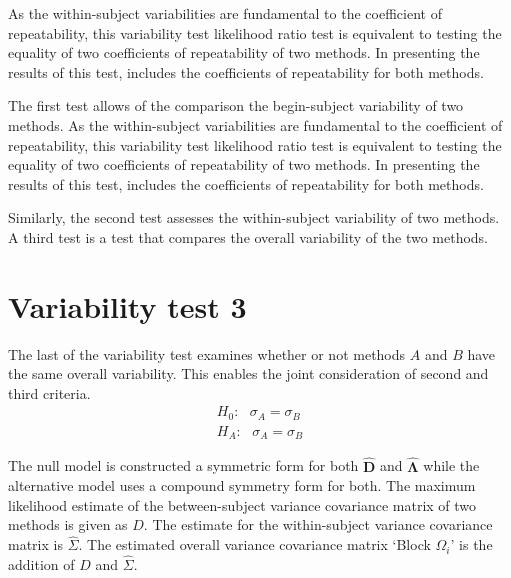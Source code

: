 \documentclass[12pt, a4paper]{report}
\theoremstyle{plain}
\theoremstyle{definition}
\theoremstyle{remark}
\begin{document}
	As the within-subject variabilities are fundamental to the coefficient of repeatability, this variability test likelihood ratio test is equivalent to testing the equality of two coefficients of repeatability of two methods. In presenting the results of this test, \citet{roy} includes the coefficients of repeatability for both methods.
	
	The first test allows of the comparison the begin-subject variability of two methods. As the within-subject variabilities are fundamental to the coefficient of repeatability, this variability test likelihood ratio test is equivalent to testing the equality of two coefficients of repeatability of two methods. In presenting the results of this test, \citet{roy} includes the coefficients of repeatability for both methods.
	
	
	
	Similarly, the second test
	assesses the within-subject variability of two methods. A third test is a test that compares the overall variability of the two methods.
	
	
	
	\newpage
	\section{Variability test 3}
	The last of the variability test examines whether or not methods $A$ and $B$ have the same overall variability. This enables the joint consideration of second and third criteria.
	\begin{eqnarray*}
		H_{0}: \mbox{ }\sigma_{A}  = \sigma_{B} \\
		H_{A}: \mbox{ }\sigma_{A}  = \sigma_{B}
	\end{eqnarray*}
	
	
	The null model is constructed a symmetric form for both $\boldsymbol{\hat{D}}$ and $\boldsymbol{\hat{\Lambda}}$ while the alternative model uses a compound symmetry form for both.
	The maximum likelihood estimate of the between-subject variance
	covariance matrix of two methods is given as $D$. The estimate for
	the within-subject variance covariance matrix is $\hat{\Sigma}$.
	The estimated overall variance covariance matrix `Block
	$\Omega_{i}$' is the addition of $\hat{D}$ and $\hat{\Sigma}$.
	
\end{document}
